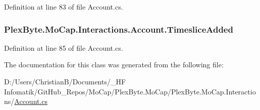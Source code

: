 Definition at line 83 of file Account.\+cs.

\subsubsection[{\texorpdfstring{Timeslice\+Added}{TimesliceAdded}}]{ Plex\+Byte.\+Mo\+Cap.\+Interactions.\+Account.\+Timeslice\+Added}\hypertarget{class_plex_byte_1_1_mo_cap_1_1_interactions_1_1_account_a10f5bed89fdad33cafcb018e3f4f7bd8}{}\label{class_plex_byte_1_1_mo_cap_1_1_interactions_1_1_account_a10f5bed89fdad33cafcb018e3f4f7bd8}


Definition at line 85 of file Account.\+cs.



The documentation for this class was generated from the following file\+:\begin{DoxyCompactItemize}
\item 
D\+:/\+Users/\+Christian\+B/\+Documents/\+\_\+\+H\+F Infomatik/\+Git\+Hub\+\_\+\+Repos/\+Mo\+Cap/\+Plex\+Byte.\+Mo\+Cap/\+Plex\+Byte.\+Mo\+Cap.\+Interactions/\hyperlink{_account_8cs}{Account.\+cs}\end{DoxyCompactItemize}
